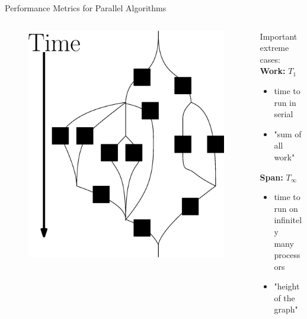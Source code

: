 \documentclass[table,serif,mathserif,final]{beamer}
\theoremstyle{remark}
\begin{document}
\begin{frame}
\begin{block}{\Huge Performance Metrics for Parallel Algorithms}
  \Huge
  \begin{columns}[T]
    \begin{column}{0.5\linewidth}
    \begin{figure}
      \includegraphics[width=0.8\linewidth]{imgs/parallelForLoop/altParallelForLoopComposition.eps}
    \end{figure}
    \end{column}
    \hfill
    \begin{column}{0.5\linewidth}
    Important extreme cases:\\
    \vspace{0.3cm}
    \textbf{Work:} $T_1$
    \begin{itemize}
      \item time to run in serial
      \item "sum of all work"
    \end{itemize}
    \vspace{0.3cm}
    \textbf{Span:} $T_\infty$
    \begin{itemize}
      \item time to run on infinitely \\many processors
      \item "height of the graph"
    \end{itemize}	
    \end{column}
\end{columns}
\end{block}
\vspace{1cm}


\end{frame}
\end{document}
